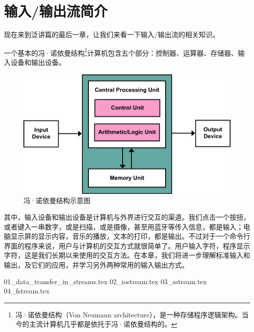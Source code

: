 \chapter{输入/输出流简介}
现在来到泛讲篇的最后一章，让我们来看一下输入/输出流的相关知识。\par
一个基本的冯·诺依曼结构\footnote{冯·诺依曼结构（Von Neumann architecture），是一种存储程序逻辑架构。当今的主流计算机几乎都是依托于冯·诺依曼结构的。}计算机包含五个部分：控制器、运算器、存储器、输入设备和输出设备。
\begin{figure}[htbp]
    \centering
    \includegraphics[width=.5\textwidth]{../images/generalized_parts/13_von_neumann_architecture.png}
    \caption{冯·诺依曼结构示意图}
\end{figure}
其中，输入设备和输出设备是计算机与外界进行交互的渠道。我们点击一个按扭，或者键入一串数字，或是扫描，或是摄像，甚至用蓝牙等传入信息，都是输入；电脑显示屏的显示内容，音乐的播放，文本的打印，都是输出。不过对于一个命令行界面的程序来说，用户与计算机的交互方式就很简单了。用户输入字符，程序显示字符，这是我们长期以来使用的交互方法。在本章，我们将进一步理解标准输入和输出，及它们的应用，并学习另外两种常用的输入输出方式。\par
{01_data_transfer_in_streams.tex}
{02_iostream.tex}
{03_sstream.tex}
{04_fstream.tex}
